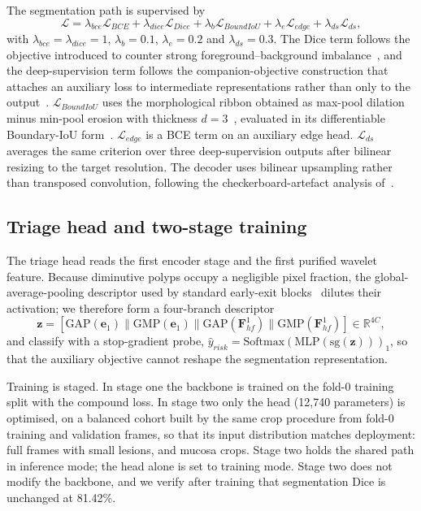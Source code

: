\documentclass[journal]{IEEEtran}
\begin{document}
The segmentation path is supervised by
\begin{equation}
\mathcal{L}=\lambda_{bce}\mathcal{L}_{BCE}+\lambda_{dice}\mathcal{L}_{Dice}+\lambda_{b}\mathcal{L}_{BoundIoU}+\lambda_{e}\mathcal{L}_{edge}+\lambda_{ds}\mathcal{L}_{ds},
\end{equation}
with $\lambda_{bce}=\lambda_{dice}=1$, $\lambda_b=0.1$, $\lambda_e=0.2$ and $\lambda_{ds}=0.3$. The Dice term follows the objective introduced to counter strong foreground--background imbalance~\cite{milletari2016vnet}, and the deep-supervision term follows the companion-objective construction that attaches an auxiliary loss to intermediate representations rather than only to the output~\cite{lee2015dsn}. $\mathcal{L}_{BoundIoU}$ uses the morphological ribbon obtained as max-pool dilation minus min-pool erosion with thickness $d=3$~\cite{eljurdi2021perimeter,karimi2019hd}, evaluated in its differentiable Boundary-IoU form~\cite{cheng2021boundaryiou}. $\mathcal{L}_{edge}$ is a BCE term on an auxiliary edge head. $\mathcal{L}_{ds}$ averages the same criterion over three deep-supervision outputs after bilinear resizing to the target resolution. The decoder uses bilinear upsampling rather than transposed convolution, following the checkerboard-artefact analysis of~\cite{odena2016checker}.

\subsection{Triage head and two-stage training}

The triage head reads the first encoder stage and the first purified wavelet feature. Because diminutive polyps occupy a negligible pixel fraction, the global-average-pooling descriptor used by standard early-exit blocks~\cite{demir2024earlyexit} dilutes their activation; we therefore form a four-branch descriptor
\begin{equation}
\mathbf{z}=[\mathrm{GAP}(\mathbf{e}_1)\|\mathrm{GMP}(\mathbf{e}_1)\|\mathrm{GAP}(\mathbf{F}_{hf}^{1})\|\mathrm{GMP}(\mathbf{F}_{hf}^{1})]\in\mathbb{R}^{4C},
\end{equation}
and classify with a stop-gradient probe, $\hat{y}_{risk}=\mathrm{Softmax}(\mathrm{MLP}(\mathrm{sg}(\mathbf{z})))_1$, so that the auxiliary objective cannot reshape the segmentation representation.

Training is staged. In stage one the backbone is trained on the fold-0 training split with the compound loss. In stage two only the head (12{,}740 parameters) is optimised, on a balanced cohort built by the same crop procedure from fold-0 training and validation frames, so that its input distribution matches deployment: full frames with small lesions, and mucosa crops. Stage two holds the shared path in inference mode; the head alone is set to training mode. Stage two does not modify the backbone, and we verify after training that segmentation Dice is unchanged at 81.42\%.
\end{document}
